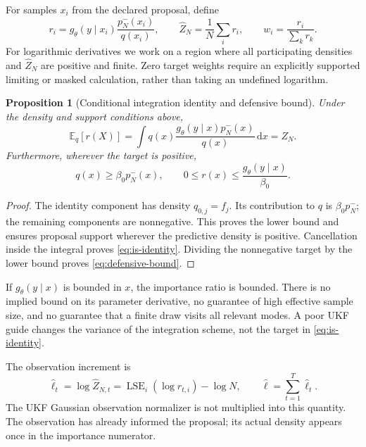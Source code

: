 \documentclass[11pt,a4paper]{article}
\newcommand{\E}{\mathbb E}
\newcommand{\dd}{\mathrm d}
\newcommand{\lse}{\operatorname{LSE}}
\newtheorem{proposition}{Proposition}[section]
\begin{document}
For samples \(x_i\) from the declared proposal, define
\begin{equation}
\label{eq:importance-ratio}
 r_i=g_\theta(y\mid x_i)\frac{p_N^-(x_i)}{q(x_i)},\qquad
 \widehat Z_N=\frac1N\sum_i r_i,\qquad
 w_i=\frac{r_i}{\sum_k r_k}.
\end{equation}
For logarithmic derivatives we work on a region where all participating
densities and \(\widehat Z_N\) are positive and finite.
Zero target weights require an explicitly supported limiting or masked
calculation, rather than taking an undefined logarithm.

\begin{proposition}[Conditional integration identity and defensive bound]
Under the density and support conditions above,
\begin{equation}
\label{eq:is-identity}
 \E_q[r(X)]
 =\int q(x)\frac{g_\theta(y\mid x)p_N^-(x)}{q(x)}\,\dd x
 =Z_N .
\end{equation}
Furthermore, wherever the target is positive,
\begin{equation}
\label{eq:defensive-bound}
 q(x)\geq\beta_0p_N^-(x),\qquad
 0\leq r(x)\leq\frac{g_\theta(y\mid x)}{\beta_0}.
\end{equation}
\end{proposition}
\begin{proof}
The identity component has density \(q_{0,j}=f_j\). Its contribution to
\(q\) is \(\beta_0p_N^-\); the remaining components are nonnegative.
This proves the lower bound and ensures proposal support wherever the
predictive density is positive. Cancellation inside the integral proves
\eqref{eq:is-identity}. Dividing the nonnegative target by the lower
bound proves \eqref{eq:defensive-bound}.
\end{proof}

If \(g_\theta(y\mid x)\) is bounded in \(x\), the importance ratio is
bounded. There is no implied bound on its parameter derivative, no
guarantee of high effective sample size, and no guarantee that a finite
draw visits all relevant modes. A poor UKF guide changes the variance of
the integration scheme, not the target in \eqref{eq:is-identity}.

The observation increment is
\begin{equation}
\label{eq:log-increment}
 \widehat\ell_t
 =\log\widehat Z_{N,t}
 =\lse_i(\log r_{t,i})-\log N,\qquad
 \widehat\ell=\sum_{t=1}^T\widehat\ell_t.
\end{equation}
The UKF Gaussian observation normalizer is not multiplied into this
quantity. The observation has already informed the proposal; its actual
density appears once in the importance numerator.
\end{document}
